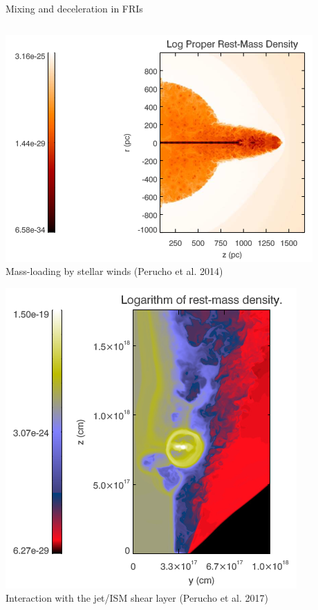 \begin{frame}{Mixing and deceleration in FRIs}
	\begin{columns}
		\begin{column}{.5\textwidth}
			\includegraphics[width=.8\linewidth]{images/perucho_2014.png}
				{\tiny Mass-loading by stellar winds (Perucho et al. 2014)}

			\includegraphics[width=.7\linewidth]{images/perucho_2017.png} \\
				{\tiny Interaction with the jet/ISM shear layer (Perucho et al. 2017)}
		\end{column}
		\begin{column}{.5\textwidth}


\end{column}
\end{columns}
\end{frame}
